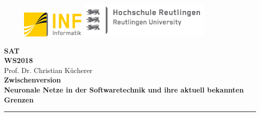 \begin{titlepage}

\begin{center}

\begin{figure}
\begin{minipage}[H]{4cm}
\centering
\includegraphics[width=0.8\linewidth]{Bilder/Deckblatt/UniversityLogo.png}
\end{minipage}
\hfill
\begin{minipage}[H]{6cm}
\centering
\includegraphics[width=1\linewidth]{Bilder/Deckblatt/CompanyLogo.jpg}
\end{minipage}
\end{figure}

\vspace*{0.8cm}

\textbf{SAT} \\
\vspace*{0.2cm}
{\large \textbf{WS2018\\}}
\vspace*{0.4cm}
Prof. Dr. Christian Kücherer\\
\vspace*{0.8cm}
{\large \textbf{Zwischenversion}}
\vspace*{0.2cm}\\
\textbf{{\large {\Large Neuronale Netze in der Softwaretechnik und ihre aktuell bekannten Grenzen }}}\\

\noindent\rule{\textwidth}{2pt}
\vspace*{0.6cm}


\end{center}
\end{titlepage}

